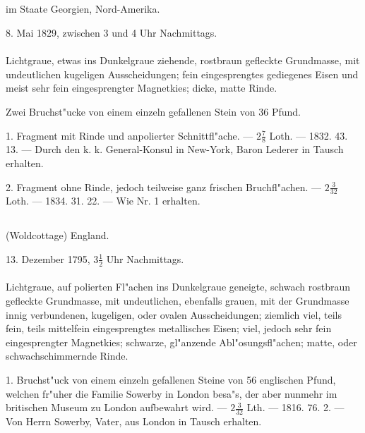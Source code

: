 \documentclass[a4paper, 11pt, oneside, polutonikogreek, german]{article}
\begin{document}
\subsection[\frakfamily{Forsyth.}]{}
\begin{center}

im Staate Georgien, Nord-Amerika.

8. Mai 1829, zwischen 3 und 4 Uhr Nachmittags.
\end{center}
\paragraph{}
Lichtgraue, etwas ins Dunkelgraue ziehende, rostbraun gefleckte Grundmasse, mit undeutlichen kugeligen Ausscheidungen; fein eingesprengtes gediegenes Eisen und meist sehr fein eingesprengter Magnetkies; dicke, matte Rinde.

Zwei Bruchst"ucke von einem einzeln gefallenen Stein von 36 Pfund.

1. Fragment mit Rinde und anpolierter Schnittfl"ache. --- $2\frac{7}{8}$ Loth. --- 1832. 43. 13. --- Durch den k. k. General-Konsul in New-York, Baron Lederer in Tausch erhalten.

2. Fragment ohne Rinde, jedoch teilweise ganz frischen Bruchfl"achen. --- $2\frac{3}{32}$ Loth. --- 1834. 31. 22. --- Wie Nr. 1 erhalten.
\subsection{}
\begin{center}

(Woldcottage) England.

13. Dezember 1795, $3\frac{1}{2}$ Uhr Nachmittags.
\end{center}
\paragraph{}
Lichtgraue, auf polierten Fl"achen ins Dunkelgraue geneigte, schwach rostbraun gefleckte Grundmasse, mit undeutlichen, ebenfalls grauen, mit der Grundmasse innig verbundenen, kugeligen, oder ovalen Ausscheidungen; ziemlich viel, teils fein, teils mittelfein eingesprengtes metallisches Eisen; viel, jedoch sehr fein eingesprengter Magnetkies; schwarze, gl"anzende Abl"osungsfl"achen; matte, oder schwachschimmernde Rinde.

1. Bruchst"uck von einem einzeln gefallenen Steine von 56 englischen Pfund, welchen fr"uher die Familie Sowerby in London besa"s, der aber nunmehr im britischen Museum zu London aufbewahrt wird. --- $2\frac{3}{32}$ Lth. --- 1816. 76. 2. --- Von Herrn Sowerby, Vater, aus London in Tausch erhalten.
\end{document}
